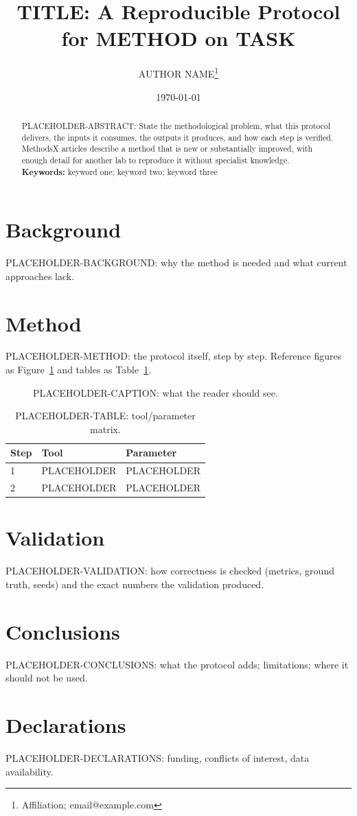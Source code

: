 \documentclass[11pt]{article}
\title{TITLE: A Reproducible Protocol for METHOD on TASK}
\author{AUTHOR NAME\thanks{Affiliation; email@example.com}}
\date{\today}
\begin{document}
\maketitle

\begin{abstract}
\noindent PLACEHOLDER-ABSTRACT: State the methodological problem, what this protocol delivers,
the inputs it consumes, the outputs it produces, and how each step is verified.
MethodsX articles describe a method that is new or substantially improved,
with enough detail for another lab to reproduce it without specialist knowledge.
\\[2mm]
\textbf{Keywords:} keyword one; keyword two; keyword three
\end{abstract}

\section{Background}
PLACEHOLDER-BACKGROUND: why the method is needed and what current approaches lack.

\section{Method}
PLACEHOLDER-METHOD: the protocol itself, step by step. Reference figures as
Figure~\ref{fig:placeholder} and tables as Table~\ref{tab:placeholder}.

\begin{figure}[t]
\centering
\caption{PLACEHOLDER-CAPTION: what the reader should see.}
\label{fig:placeholder}
\end{figure}

\begin{table}[t]
\centering
\caption{PLACEHOLDER-TABLE: tool/parameter matrix.}
\label{tab:placeholder}
\begin{tabular}{lll}
\toprule
Step & Tool & Parameter \\
\midrule
1 & PLACEHOLDER & PLACEHOLDER \\
2 & PLACEHOLDER & PLACEHOLDER \\
\bottomrule
\end{tabular}
\end{table}

\section{Validation}
PLACEHOLDER-VALIDATION: how correctness is checked (metrics, ground truth, seeds)
and the exact numbers the validation produced.

\section{Conclusions}
PLACEHOLDER-CONCLUSIONS: what the protocol adds; limitations; where it should not be used.

\section*{Declarations}
PLACEHOLDER-DECLARATIONS: funding, conflicts of interest, data availability.



\end{document}
